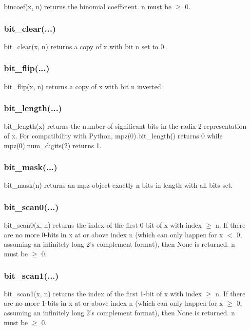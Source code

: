 bincoef(x, n) returns the binomial coefficient. n must be $\ge$ 0.

\subsubsection{bit\_clear(...)}

bit\_clear(x, n) returns a copy of x with bit n set to 0.

\subsubsection{bit\_flip(...)}

bit\_flip(x, n) returns a copy of x with bit n inverted.

\subsubsection{bit\_length(...)}

bit\_length(x) returns the number of significant bits in the radix-2 representation of x. For
compatibility with Python, mpz(0).bit\_length() returns 0 while mpz(0).num\_digits(2) returns 1.

\subsubsection{bit\_mask(...)}

bit\_mask(n) returns an mpz object exactly n bits in length with all bits set.

\subsubsection{bit\_scan0(...)}

bit\_scan0(x, n) returns the index of the first 0-bit of x with index $\ge$ n. If there are no more
0-bits in x at or above index n (which can only happen for x $<$ 0, assuming an infinitely long 2's
complement format), then None is returned. n must be $\ge$ 0.

\subsubsection{bit\_scan1(...)}

bit\_scan1(x, n) returns the index of the first 1-bit of x with index $\ge$ n. If there are no more
1-bits in x at or above index n (which can only happen for x $\ge$ 0, assuming an infinitely long 2's
complement format), then None is returned. n must be $\ge$ 0.

